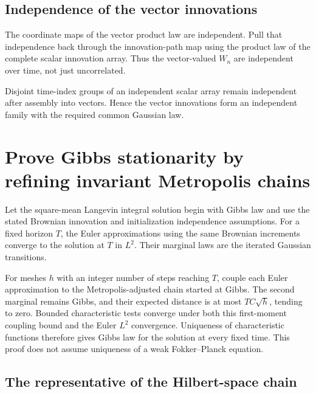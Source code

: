 \documentclass[11pt,a4paper]{report}
\begin{document}
\subsection{\texorpdfstring{Independence of the vector innovations}{Independence of the vector innovations}}
\label{report-step-UnadjustedLangevin-GaussianInnovationVectors-lean-3}


The coordinate maps of the vector product law are independent. Pull that independence back through the innovation-path map using the product law of the complete scalar innovation array. Thus the vector-valued \(W_n\) are independent over time, not just uncorrelated.



Disjoint time-index groups of an independent scalar array remain independent after assembly into vectors. Hence the vector innovations form an independent family with the required common Gaussian law.

\section{\texorpdfstring{Prove Gibbs stationarity by refining invariant Metropolis chains}{Prove Gibbs stationarity by refining invariant Metropolis chains}}
\label{proof-module-UnadjustedLangevin-GibbsStationarity-lean}


Let the square-mean Langevin integral solution begin with Gibbs law and use the stated Brownian innovation and initialization independence assumptions. For a fixed horizon \(T\), the Euler approximations using the same Brownian increments converge to the solution at \(T\) in \(L^2\). Their marginal laws are the iterated Gaussian transitions.



For meshes \(h\) with an integer number of steps reaching \(T\), couple each Euler approximation to the Metropolis-adjusted chain started at Gibbs. The second marginal remains Gibbs, and their expected distance is at most \(TC\sqrt h\), tending to zero. Bounded characteristic tests converge under both this first-moment coupling bound and the Euler \(L^2\) convergence. Uniqueness of characteristic functions therefore gives Gibbs law for the solution at every fixed time. This proof does not assume uniqueness of a weak Fokker–Planck equation.

\subsection{\texorpdfstring{The representative of the Hilbert-space chain}{The representative of the Hilbert-space chain}}
\label{report-step-UnadjustedLangevin-GibbsStationarity-lean-1}
\end{document}
